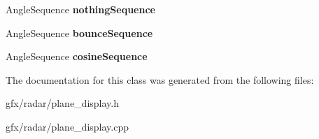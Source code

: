 \begin{DoxyCompactItemize}
\item 
Angle\+Sequence {\bfseries nothing\+Sequence}\hypertarget{classRadar_1_1PlaneDisplay_ac47f25780e010d65cda280fa2cfbb447}{}\label{classRadar_1_1PlaneDisplay_ac47f25780e010d65cda280fa2cfbb447}

\item 
Angle\+Sequence {\bfseries bounce\+Sequence}\hypertarget{classRadar_1_1PlaneDisplay_a1772bc08f6c28b9282c28e8f46480f3e}{}\label{classRadar_1_1PlaneDisplay_a1772bc08f6c28b9282c28e8f46480f3e}

\item 
Angle\+Sequence {\bfseries cosine\+Sequence}\hypertarget{classRadar_1_1PlaneDisplay_a7276e5ff96cb4151ab6531cf3721d3ca}{}\label{classRadar_1_1PlaneDisplay_a7276e5ff96cb4151ab6531cf3721d3ca}

\end{DoxyCompactItemize}


The documentation for this class was generated from the following files\+:\begin{DoxyCompactItemize}
\item 
gfx/radar/plane\+\_\+display.\+h\item 
gfx/radar/plane\+\_\+display.\+cpp\end{DoxyCompactItemize}
